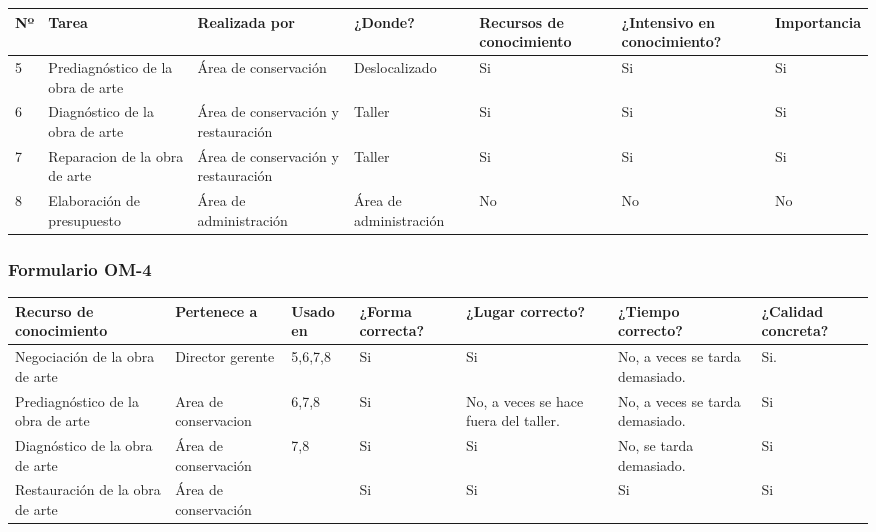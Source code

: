 \documentclass[a4paper,11pt]{article}
\begin{document}
			\begin{landscape}
			\begin{center}
				\begin{tabular}{| l | p{4cm} | p{2.8cm} | p{2cm} | p{2cm} | p{3cm} |
				p{2.2cm} |}
					\hline
					\textbf{Nº} & \textbf{Tarea} & \textbf{Realizada por} & \textbf{¿Donde?} & \textbf{Recursos de conocimiento} &
					\textbf{¿Intensivo en conocimiento?} & \textbf{Importancia}\\
					\hline
					5 & Prediagnóstico de la obra de arte & Área de conservación &
					Deslocalizado & Si & Si & Si\\
					\hline
					6 & Diagnóstico de la obra de arte & Área de conservación y restauración &
					Taller & Si & Si & Si\\
					\hline
					7 & Reparacion de la obra de arte & Área de conservación y restauración &
					Taller & Si & Si & Si\\
					\hline
					8 & Elaboración de presupuesto & Área de administración & Área de
					administración & No & No & No\\
					\hline
				\end{tabular}
			\end{center}
			\end{landscape}
			\newpage
			\begin{landscape}
			\subsubsection{Formulario OM-4}
			\begin{center}
				\begin{tabular}{| p{5cm} | p{2.4cm} | p{2cm} | p{2cm} | p{2cm} | p{2cm} |
				p{2cm} |}
					\hline
					\textbf{Recurso de conocimiento} & \textbf{Pertenece a} & \textbf{Usado en} & \textbf{¿Forma correcta?} & \textbf{¿Lugar correcto?} &
					\textbf{¿Tiempo correcto?} & \textbf{¿Calidad concreta?}\\
					\hline
					Negociación de la obra de arte & Director gerente & 5,6,7,8 & Si & Si & No, a
					veces se tarda demasiado. & Si.\\
					\hline
					Prediagnóstico de la obra de arte & Area de conservacion & 6,7,8 & Si & No,
					a veces se hace fuera del taller. & No, a veces se tarda demasiado. & Si\\
					\hline
					Diagnóstico de la obra de arte & Área de conservación & 7,8 & Si & Si & No,
					se tarda demasiado. & Si\\
					\hline
					Restauración de la obra de arte & Área de conservación & & Si & Si & Si & Si\\
					\hline
				\end{tabular}
			\end{center}
			\end{landscape}
			\newpage
\end{document}

